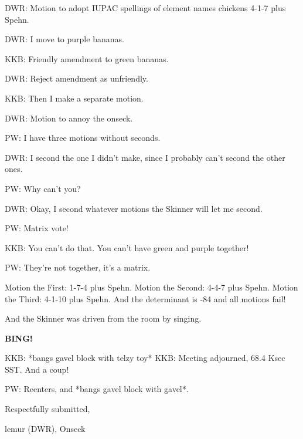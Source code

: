 \documentclass[10pt]{article}
\newcommand{\bing}{{\bf BING!} }
\newcommand{\ps}{ plus Spehn\xspace}
\newcommand{\onseck}{lemur (DWR), Onseck}
\begin{document}
DWR: Motion to adopt IUPAC spellings of element names chickens 4-1-7\ps.

DWR: I move to purple bananas.

KKB: Friendly amendment to green bananas.

DWR: Reject amendment as unfriendly.

KKB: Then I make a separate motion.

DWR: Motion to annoy the onseck.

PW: I have three motions without seconds.

DWR: I second the one I didn't make, since I probably can't
second the other ones.

PW: Why can't you?

DWR: Okay, I second whatever motions the Skinner will let me second.

PW: Matrix vote!

KKB: You can't do that.  You can't have green and purple together!

PW: They're not together, it's a matrix.

Motion the First: 1-7-4\ps.
Motion the Second: 4-4-7\ps.
Motion the Third: 4-1-10\ps.
And the determinant is -84 and all motions fail!

And the Skinner was driven from the room by singing.

\bing
\noindent

KKB: *bangs gavel block with telzy toy*
KKB: Meeting adjourned, 68.4 Ksec SST.  And a coup!

PW: Reenters, and *bangs gavel block with gavel*.


\vspace{18pt}

\centerline{Respectfully submitted,}
\centerline{\onseck}
\end{document}
